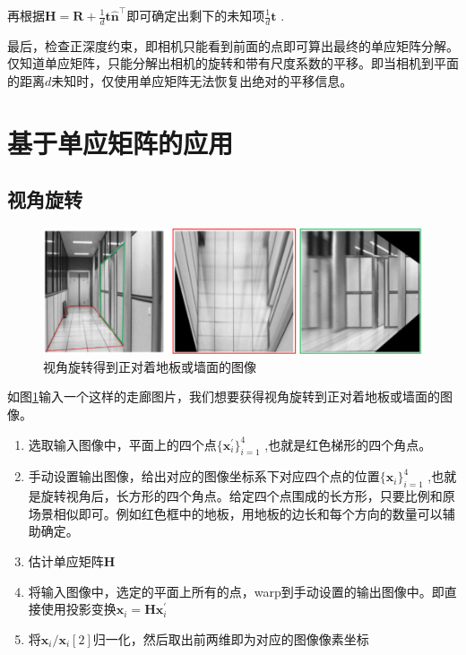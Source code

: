 \documentclass{article}
\begin{document}
再根据$\mathbf{H}=\mathbf{R}+\frac1d\mathbf{t}\hat{\mathbf{n}}^\top$即可确定出剩下的未知项$\frac1d\mathbf{t}$ .

最后，检查正深度约束，即相机只能看到前面的点即可算出最终的单应矩阵分解。
仅知道单应矩阵，只能分解出相机的旋转和带有尺度系数的平移。即当相机到平面的距离$d$未知时，仅使用单应矩阵无法恢复出绝对的平移信息。

\section{基于单应矩阵的应用}
\subsection{视角旋转}

\begin{figure}[h]
    \centering
    \includegraphics[width=1\textwidth]{./xinhaochuli/2.png}
    \caption{视角旋转得到正对着地板或墙面的图像}
    \label{fig:2}
\end{figure}


如图\ref{fig:2}输入一个这样的走廊图片，我们想要获得视角旋转到正对着地板或墙面的图像。

\begin{enumerate}
  \item 选取输入图像中，平面上的四个点$\{\mathbf{x}_i^{\prime}\}_{i=1}^4$ ,也就是红色梯形的四个角点。
  \item 手动设置输出图像，给出对应的图像坐标系下对应四个点的位置$\{\mathbf{x}_i\}_{i=1}^4$ ,也就是旋转视角后，长方形的四个角点。给定四个点围成的长方形，只要比例和原场景相似即可。例如红色框中的地板，用地板的边长和每个方向的数量可以辅助确定。
  \item 估计单应矩阵$\mathbf{H}$
  \item 将输入图像中，选定的平面上所有的点，warp到手动设置的输出图像中。即直接使用投影变换$\mathbf{x}_i=\mathbf{H}\mathbf{x}_i^{\prime}$
  \item 将$\mathbf{x}_i/\mathbf{x}_i[2]$归一化，然后取出前两维即为对应的图像像素坐标
\end{enumerate}
\end{document}
